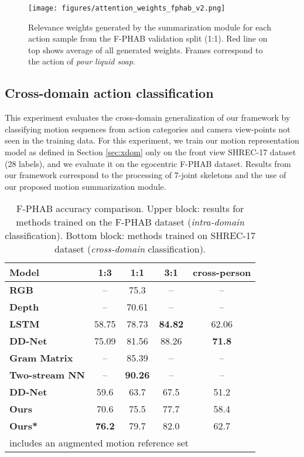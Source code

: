 \documentclass[letterpaper, 10 pt, conference]{ieeeconf}
\begin{document}
\begin{figure}[!htb]
    \centering
    \texttt{[image: figures/attention\_weights\_fphab\_v2.png]}
    \caption{Relevance weights generated by the summarization module for each action sample from the F-PHAB validation split (1:1). Red line on top shows average of all generated weights. Frames correspond to the action of \textit{pour liquid soap}.
}    
    \label{fig:att_weights}
\end{figure}




\subsection{Cross-domain action classification}
\label{sec:fphab_bench}

This experiment evaluates the cross-domain generalization of our framework by classifying motion sequences from action categories and camera view-points not seen in the training data. 
For this experiment, we train our motion representation model as defined in Section \ref{sec:xdom} only on the front view SHREC-17 dataset (28 labels), and we evaluate it on the egocentric F-PHAB dataset. Results from our framework correspond to the processing of 7-joint skeletons and the use of our proposed motion summarization module.

\begin{table}[!tb]
\centering
\begin{tabular}{|l|c|c|c|c|}
\hline
\textbf{Model} & \textbf{1:3} & \textbf{1:1} & \textbf{3:1} & \textbf{cross-person} \\ \hline
\textbf{RGB \cite{feichtenhofer2016convolutional}} & -- & 75.3 & -- & -- \\ \hline
\textbf{Depth \cite{oreifej2013hon4d}} & -- & 70.61 & -- & -- \\ \hline
\textbf{LSTM \cite{zhu2016co}} & 58.75 & 78.73 & \textbf{84.82} & 62.06 \\ \hline
\textbf{DD-Net \cite{yang2019make}} & 75.09 & 81.56 & 88.26 & \textbf{71.8} \\ \hline \textbf{Gram Matrix \cite{zhang2016efficient}} & -- & 85.39 & -- & -- \\ \hline
\textbf{Two-stream NN \cite{li2021two}} & -- & \textbf{90.26} & -- & -- \\ \hline\hline
\textbf{DD-Net \cite{yang2019make}} & 59.6 & 63.7 & 67.5 & 51.2 \\ \hline
\textbf{Ours} & 70.6 & 75.5 & 77.7 & 58.4 \\ \hline
\textbf{Ours*} & \textbf{76.2} & 79.7 & 82.0 & 62.7 \\ \hline
\multicolumn{5}{l}{\footnotesize  includes an augmented motion reference set} \\
\end{tabular}
\caption{F-PHAB accuracy comparison. Upper block: results for methods trained on the F-PHAB dataset (\textit{intra-domain} classification). Bottom block: methods trained on SHREC-17 dataset (\textit{cross-domain} classification).}
\label{tab:phab_ablation}
\end{table}
\end{document}

